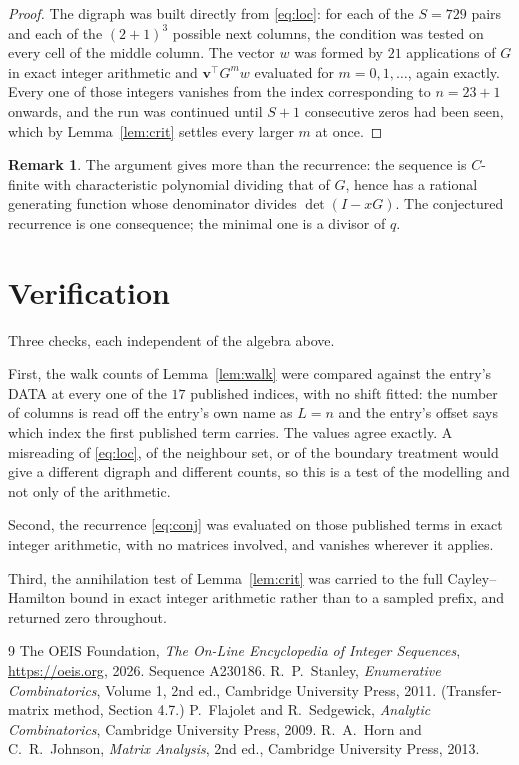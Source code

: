\documentclass[11pt,a4paper]{article}
\theoremstyle{plain}
\theoremstyle{definition}
\newtheorem{remark}[theorem]{Remark}
\begin{document}
\begin{proof}
The digraph was built directly from \eqref{eq:loc}: for each of the $S=729$ pairs and each
of the $(2+1)^{3}$ possible next columns, the condition was tested on every cell of
the middle column. The vector $w$ was formed by $21$ applications of $G$ in exact integer
arithmetic and $\mathbf{v}^{\!\top}G^{m}w$ evaluated for $m=0,1,\dots$, again exactly.
Every one of those integers vanishes from the index corresponding to $n=23+1$ onwards,
and the run was continued until $S+1$ consecutive zeros had been seen, which by
Lemma~\ref{lem:crit} settles every larger $m$ at once.
\end{proof}

\begin{remark}
The argument gives more than the recurrence: the sequence is $C$-finite with characteristic
polynomial dividing that of $G$, hence has a rational generating function whose denominator
divides $\det(I-xG)$. The conjectured recurrence is one consequence; the minimal one is a
divisor of $q$.
\end{remark}

\section{Verification}

Three checks, each independent of the algebra above.

First, the walk counts of Lemma~\ref{lem:walk} were compared against the entry's DATA at
every one of the $17$ published indices, with no shift fitted: the number of columns is
read off the entry's own name as $L=n$ and the entry's offset says which index the first
published term carries. The values agree exactly. A misreading of \eqref{eq:loc}, of the
neighbour set, or of the boundary treatment would give a different digraph and different
counts, so this is a test of the modelling and not only of the arithmetic.

Second, the recurrence \eqref{eq:conj} was evaluated on those published terms in exact
integer arithmetic, with no matrices involved, and vanishes wherever it applies.

Third, the annihilation test of Lemma~\ref{lem:crit} was carried to the full
Cayley--Hamilton bound in exact integer arithmetic rather than to a sampled prefix, and
returned zero throughout.

\begin{thebibliography}{9}
 The OEIS Foundation, \emph{The On-Line Encyclopedia of Integer
Sequences}, \url{https://oeis.org}, 2026. Sequence A230186.
 R.~P.~Stanley, \emph{Enumerative Combinatorics}, Volume 1, 2nd ed.,
Cambridge University Press, 2011. (Transfer-matrix method, Section 4.7.)
 P.~Flajolet and R.~Sedgewick, \emph{Analytic Combinatorics}, Cambridge
University Press, 2009.
 R.~A.~Horn and C.~R.~Johnson, \emph{Matrix Analysis}, 2nd ed., Cambridge
University Press, 2013.
\end{thebibliography}
\end{document}

